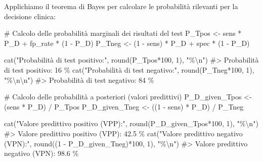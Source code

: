 \documentclass[
  letterpaper,
  DIV=11,
  numbers=noendperiod,
  oneside]{scrreprt}
\newenvironment{Shaded}{\begin{snugshade}}{\end{snugshade}}
\newcommand{\CommentTok}[1]{\textcolor[rgb]{0.37,0.37,0.37}{#1}}
\newcommand{\DecValTok}[1]{\textcolor[rgb]{0.68,0.00,0.00}{#1}}
\newcommand{\FunctionTok}[1]{\textcolor[rgb]{0.28,0.35,0.67}{#1}}
\newcommand{\NormalTok}[1]{\textcolor[rgb]{0.00,0.23,0.31}{#1}}
\newcommand{\OtherTok}[1]{\textcolor[rgb]{0.00,0.23,0.31}{#1}}
\newcommand{\SpecialCharTok}[1]{\textcolor[rgb]{0.37,0.37,0.37}{#1}}
\newcommand{\StringTok}[1]{\textcolor[rgb]{0.13,0.47,0.30}{#1}}
\theoremstyle{definition}
\theoremstyle{plain}
\theoremstyle{definition}
\theoremstyle{remark}
\begin{document}
\begin{tcolorbox}
Applichiamo il teorema di Bayes per calcolare le probabilità rilevanti
per la decisione clinica:

\begin{Shaded}
\begin{Highlighting}[]
\CommentTok{\# Calcolo delle probabilità marginali dei risultati del test}
\NormalTok{P\_Tpos }\OtherTok{\textless{}{-}}\NormalTok{ sens }\SpecialCharTok{*}\NormalTok{ P\_D }\SpecialCharTok{+}\NormalTok{ fp\_rate }\SpecialCharTok{*}\NormalTok{ (}\DecValTok{1} \SpecialCharTok{{-}}\NormalTok{ P\_D)}
\NormalTok{P\_Tneg }\OtherTok{\textless{}{-}}\NormalTok{ (}\DecValTok{1} \SpecialCharTok{{-}}\NormalTok{ sens) }\SpecialCharTok{*}\NormalTok{ P\_D }\SpecialCharTok{+}\NormalTok{ spec }\SpecialCharTok{*}\NormalTok{ (}\DecValTok{1} \SpecialCharTok{{-}}\NormalTok{ P\_D)}

\FunctionTok{cat}\NormalTok{(}\StringTok{"Probabilità di test positivo:"}\NormalTok{, }\FunctionTok{round}\NormalTok{(P\_Tpos}\SpecialCharTok{*}\DecValTok{100}\NormalTok{, }\DecValTok{1}\NormalTok{), }\StringTok{"\%}\SpecialCharTok{\textbackslash{}n}\StringTok{"}\NormalTok{)}
\CommentTok{\#\textgreater{} Probabilità di test positivo: 16 \%}
\FunctionTok{cat}\NormalTok{(}\StringTok{"Probabilità di test negativo:"}\NormalTok{, }\FunctionTok{round}\NormalTok{(P\_Tneg}\SpecialCharTok{*}\DecValTok{100}\NormalTok{, }\DecValTok{1}\NormalTok{), }\StringTok{"\%}\SpecialCharTok{\textbackslash{}n\textbackslash{}n}\StringTok{"}\NormalTok{)}
\CommentTok{\#\textgreater{} Probabilità di test negativo: 84 \%}

\CommentTok{\# Calcolo delle probabilità a posteriori (valori predittivi)}
\NormalTok{P\_D\_given\_Tpos }\OtherTok{\textless{}{-}}\NormalTok{ (sens }\SpecialCharTok{*}\NormalTok{ P\_D) }\SpecialCharTok{/}\NormalTok{ P\_Tpos}
\NormalTok{P\_D\_given\_Tneg }\OtherTok{\textless{}{-}}\NormalTok{ ((}\DecValTok{1} \SpecialCharTok{{-}}\NormalTok{ sens) }\SpecialCharTok{*}\NormalTok{ P\_D) }\SpecialCharTok{/}\NormalTok{ P\_Tneg}

\FunctionTok{cat}\NormalTok{(}\StringTok{"Valore predittivo positivo (VPP):"}\NormalTok{, }\FunctionTok{round}\NormalTok{(P\_D\_given\_Tpos}\SpecialCharTok{*}\DecValTok{100}\NormalTok{, }\DecValTok{1}\NormalTok{), }\StringTok{"\%}\SpecialCharTok{\textbackslash{}n}\StringTok{"}\NormalTok{)}
\CommentTok{\#\textgreater{} Valore predittivo positivo (VPP): 42.5 \%}
\FunctionTok{cat}\NormalTok{(}\StringTok{"Valore predittivo negativo (VPN):"}\NormalTok{, }\FunctionTok{round}\NormalTok{((}\DecValTok{1} \SpecialCharTok{{-}}\NormalTok{ P\_D\_given\_Tneg)}\SpecialCharTok{*}\DecValTok{100}\NormalTok{, }\DecValTok{1}\NormalTok{), }\StringTok{"\%}\SpecialCharTok{\textbackslash{}n}\StringTok{"}\NormalTok{)}
\CommentTok{\#\textgreater{} Valore predittivo negativo (VPN): 98.6 \%}
\end{Highlighting}
\end{Shaded}


\end{tcolorbox}
\end{document}
